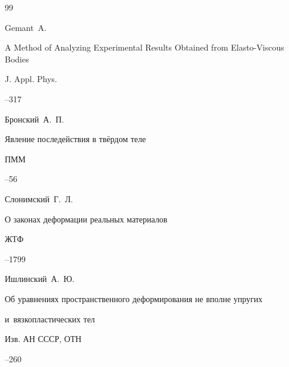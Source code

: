 \begin{thebibliography}{99}

\by Gemant~A.

\paper A Method of Analyzing Experimental Results Obtained from Elasto-Viscous Bodies 

\jour J. Appl. Phys.



--317





\by Бронский~А.~П.

\paper Явление последействия в твёрдом теле

\jour ПММ




--56







\by Слонимский~Г.~Л.

\paper О законах деформации реальных материалов

\jour ЖТФ




--1799








\by	Ишлинский~А.~Ю.

\paper Об уравнениях пространственного деформирования не вполне упругих

и~вязкопластических тел

\jour  Изв. АН СССР, ОТН



–260










\end{thebibliography}
